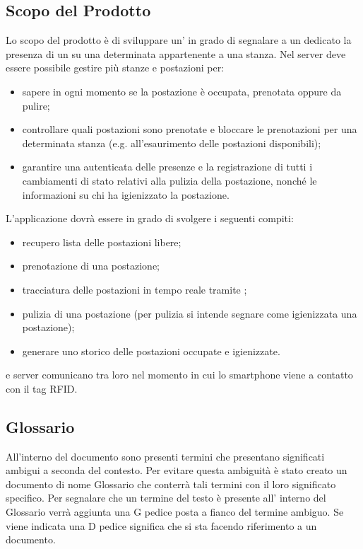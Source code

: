 \subsection{Scopo del Prodotto}
Lo scopo del prodotto è di sviluppare un’ in grado di
segnalare a un  dedicato la presenza di un  su una determinata  appartenente a
una stanza. 
Nel server deve essere possibile gestire più stanze e postazioni per:
\begin{itemize}
\item{sapere in ogni momento se la postazione è occupata, prenotata oppure da pulire;}
\item{controllare quali postazioni sono prenotate e bloccare le prenotazioni per una determinata
stanza (e.g. all'esaurimento delle postazioni disponibili);}
\item{garantire una  autenticata delle presenze e la registrazione di tutti i cambiamenti di stato relativi alla pulizia della
postazione, nonché le informazioni su chi ha igienizzato la postazione.}
\end{itemize}
L'applicazione dovrà essere in grado di svolgere i seguenti compiti:
\begin{itemize}
\item{recupero lista delle postazioni libere;}
\item{prenotazione di una postazione;}
\item{tracciatura delle postazioni in tempo reale tramite  ;}
\item{pulizia di una postazione (per pulizia si intende segnare come igienizzata una postazione)};
\item{generare uno storico delle postazioni occupate e igienizzate.}
\end{itemize}
 e server comunicano tra loro nel momento in cui lo smartphone viene  a contatto con il tag RFID.

\subsection{Glossario}
All’interno del  documento sono presenti termini che presentano significati ambigui a seconda del contesto.
Per evitare questa ambiguità è stato creato un  documento di nome Glossario che  conterrà tali termini con il loro significato specifico. Per segnalare che un termine del testo è presente all’ interno del Glossario  
verrà aggiunta una G pedice posta a fianco del termine ambiguo. 
Se viene indicata una D pedice significa che si sta facendo riferimento a un documento.

